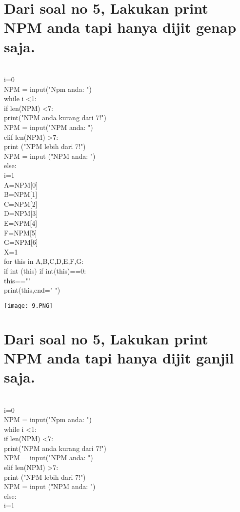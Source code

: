\documentclass{article}
\begin{document}
\section{Dari soal no 5, Lakukan print NPM anda tapi hanya dijit genap saja.}\\
i=0\\
NPM = input("Npm anda: ")\\
while i <1:\\
    if len(NPM) <7:\\
        print("NPM anda kurang dari 7!")\\
        NPM = input("NPM anda: ")\\
    elif len(NPM) >7:\\
        print ("NPM lebih dari 7!")\\
        NPM = input ("NPM anda: ")\\
    else:\\
        i=1\\

A=NPM[0]\\
B=NPM[1]\\
C=NPM[2]\\
D=NPM[3]\\
E=NPM[4]\\
F=NPM[5]\\
G=NPM[6]\\

X=1\\

for this in A,B,C,D,E,F,G:\\
    
    if int (this)%
        if int(this)==0:\\
            this==""\\
        print(this,end=" ")\\
\begin{center}
    \texttt{[image: 9.PNG]}
\end{center}

\section{Dari soal no 5, Lakukan print NPM anda tapi hanya dijit ganjil saja.}\\
i=0\\
NPM = input("Npm anda: ")\\
while i <1:\\
    if len(NPM) <7:\\
        print("NPM anda kurang dari 7!")\\
        NPM = input("NPM anda: ")\\
    elif len(NPM) >7:\\
        print ("NPM lebih dari 7!")\\
        NPM = input ("NPM anda: ")\\
    else:\\
        i=1\\
\end{document}
